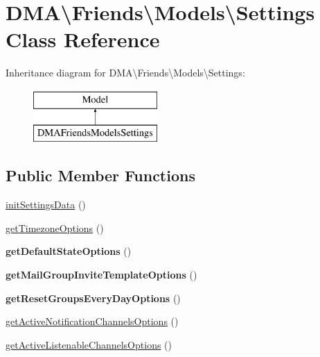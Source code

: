 \hypertarget{classDMA_1_1Friends_1_1Models_1_1Settings}{}\section{D\+M\+A\textbackslash{}Friends\textbackslash{}Models\textbackslash{}Settings Class Reference}
\label{classDMA_1_1Friends_1_1Models_1_1Settings}
Inheritance diagram for D\+M\+A\textbackslash{}Friends\textbackslash{}Models\textbackslash{}Settings\+:\begin{figure}[H]
\begin{center}
\leavevmode
\includegraphics[height=2.000000cm]{d1/d8a/classDMA_1_1Friends_1_1Models_1_1Settings}
\end{center}
\end{figure}
\subsection*{Public Member Functions}
\begin{DoxyCompactItemize}
\item 
\hyperlink{classDMA_1_1Friends_1_1Models_1_1Settings_a182b5e2b83cfc057c1cd31499ad9e244}{init\+Settings\+Data} ()
\item 
\hyperlink{classDMA_1_1Friends_1_1Models_1_1Settings_a347eae65e8aeb114767d5e4fc8542fea}{get\+Timezone\+Options} ()
\item 
\hypertarget{classDMA_1_1Friends_1_1Models_1_1Settings_a89a0d979d3ba9338c0ce304255a56bbb}{}{\bfseries get\+Default\+State\+Options} ()\label{classDMA_1_1Friends_1_1Models_1_1Settings_a89a0d979d3ba9338c0ce304255a56bbb}

\item 
\hypertarget{classDMA_1_1Friends_1_1Models_1_1Settings_aafef2e58559c6053550fe133b900246b}{}{\bfseries get\+Mail\+Group\+Invite\+Template\+Options} ()\label{classDMA_1_1Friends_1_1Models_1_1Settings_aafef2e58559c6053550fe133b900246b}

\item 
\hypertarget{classDMA_1_1Friends_1_1Models_1_1Settings_ac88752cae719c48bde66c9cb2f945952}{}{\bfseries get\+Reset\+Groups\+Every\+Day\+Options} ()\label{classDMA_1_1Friends_1_1Models_1_1Settings_ac88752cae719c48bde66c9cb2f945952}

\item 
\hyperlink{classDMA_1_1Friends_1_1Models_1_1Settings_a8c2bad0fb18f5e501d3318eba7379609}{get\+Active\+Notification\+Channels\+Options} ()
\item 
\hyperlink{classDMA_1_1Friends_1_1Models_1_1Settings_a140721a33440c666426139d6317bd357}{get\+Active\+Listenable\+Channels\+Options} ()
\end{DoxyCompactItemize}
